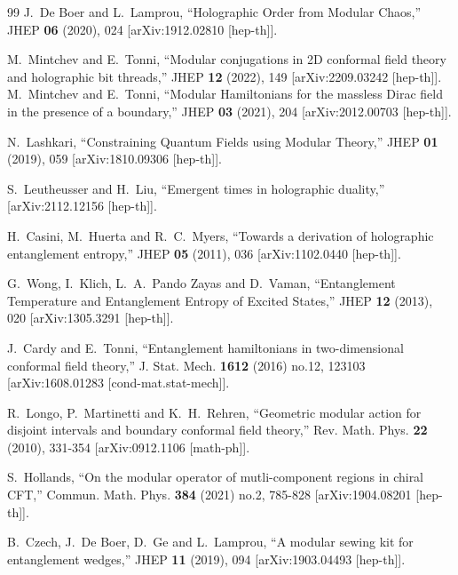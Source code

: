 \documentclass[aps,prl,twocolumn,showpacs,preprintnumbers,amsmath,amssymb]{revtex4-1}
\begin{document}
\begin{thebibliography}{99}
J.~De Boer and L.~Lamprou,
``Holographic Order from Modular Chaos,''
JHEP \textbf{06} (2020), 024
[arXiv:1912.02810 [hep-th]].

M.~Mintchev and E.~Tonni,
``Modular conjugations in 2D conformal field theory and holographic bit threads,''
JHEP \textbf{12} (2022), 149
[arXiv:2209.03242 [hep-th]].\\
M.~Mintchev and E.~Tonni,
``Modular Hamiltonians for the massless Dirac field in the presence of a boundary,''
JHEP \textbf{03} (2021), 204
[arXiv:2012.00703 [hep-th]].

N.~Lashkari,
``Constraining Quantum Fields using Modular Theory,''
JHEP \textbf{01} (2019), 059
[arXiv:1810.09306 [hep-th]].

S.~Leutheusser and H.~Liu,
``Emergent times in holographic duality,''
[arXiv:2112.12156 [hep-th]].

H.~Casini, M.~Huerta and R.~C.~Myers,
``Towards a derivation of holographic entanglement entropy,''
JHEP \textbf{05} (2011), 036
[arXiv:1102.0440 [hep-th]].

G.~Wong, I.~Klich, L.~A.~Pando Zayas and D.~Vaman,
``Entanglement Temperature and Entanglement Entropy of Excited States,''
JHEP \textbf{12} (2013), 020
[arXiv:1305.3291 [hep-th]].

J.~Cardy and E.~Tonni,
``Entanglement hamiltonians in two-dimensional conformal field theory,''
J. Stat. Mech. \textbf{1612} (2016) no.12, 123103
[arXiv:1608.01283 [cond-mat.stat-mech]].

R.~Longo, P.~Martinetti and K.~H.~Rehren,
``Geometric modular action for disjoint intervals and boundary conformal field theory,''
Rev. Math. Phys. \textbf{22} (2010), 331-354
[arXiv:0912.1106 [math-ph]].

S.~Hollands,
``On the modular operator of mutli-component regions in chiral CFT,''
Commun. Math. Phys. \textbf{384} (2021) no.2, 785-828
[arXiv:1904.08201 [hep-th]].

B.~Czech, J.~De Boer, D.~Ge and L.~Lamprou,
``A modular sewing kit for entanglement wedges,''
JHEP \textbf{11} (2019), 094
[arXiv:1903.04493 [hep-th]].


\end{thebibliography}
\end{document}
